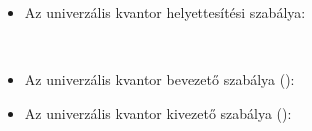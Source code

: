 \begin{itemize}
\item Az univerzális kvantor helyettesítési szabálya:
\begin{code}%
%
\>[6]\AgdaSpace{}%
\AgdaSymbol{:}%
\>[845I]\AgdaSpace{}%
\AgdaSpace{}%
\AgdaSymbol{\}\{}\AgdaSpace{}%
\AgdaSymbol{:}\AgdaSpace{}%
\AgdaSpace{}%
\AgdaSpace{}%
\AgdaSymbol{\}}\<%
\\
\>[.][@{}l@{}]\<[845I]%
\>[17]\AgdaSpace{}%
\AgdaSpace{}%
\AgdaSpace{}%
\AgdaOperator{\AgdaField{[}}\AgdaSpace{}%
\AgdaSpace{}%
\AgdaOperator{\AgdaField{]ᶠ}}\AgdaSpace{}%
\AgdaSpace{}%
\AgdaSpace{}%
\AgdaSymbol{(}\AgdaSpace{}%
\AgdaOperator{\AgdaField{[}}\AgdaSpace{}%
\AgdaSpace{}%
\AgdaSpace{}%
\AgdaSpace{}%
\AgdaSpace{}%
\AgdaSpace{}%
\AgdaOperator{\AgdaField{]ᶠ}}\AgdaSymbol{)}\<%
\end{code}
\item Az univerzális kvantor bevezető szabálya ():
\begin{code}%
%
\>[6]\AgdaSpace{}%
\AgdaSymbol{:}\AgdaSpace{}%
\AgdaSpace{}%
\AgdaSymbol{\}}\AgdaSpace{}%
\AgdaSpace{}%
\AgdaSpace{}%
\AgdaSymbol{(}\AgdaSpace{}%
\AgdaSpace{}%
\AgdaSymbol{)}\AgdaSpace{}%
\AgdaSpace{}%
\AgdaSpace{}%
\AgdaSpace{}%
\AgdaSpace{}%
\AgdaSymbol{(}\AgdaSpace{}%
\AgdaSymbol{)}\<%
\end{code}
\item Az univerzális kvantor kivezető szabálya ():
\begin{code}%
%
\>[6]\AgdaSpace{}%
\AgdaSymbol{:}\AgdaSpace{}%
\AgdaSpace{}%
\AgdaSymbol{\}}\AgdaSpace{}%
\AgdaSpace{}%
\AgdaSpace{}%
\AgdaSpace{}%
\AgdaSymbol{(}\AgdaSpace{}%
\AgdaSymbol{)}\AgdaSpace{}%
\AgdaSpace{}%
\AgdaSpace{}%
\AgdaSymbol{(}\AgdaSpace{}%
\AgdaSpace{}%
\AgdaSymbol{)}\AgdaSpace{}%
\<%
\end{code}
\end{itemize}

